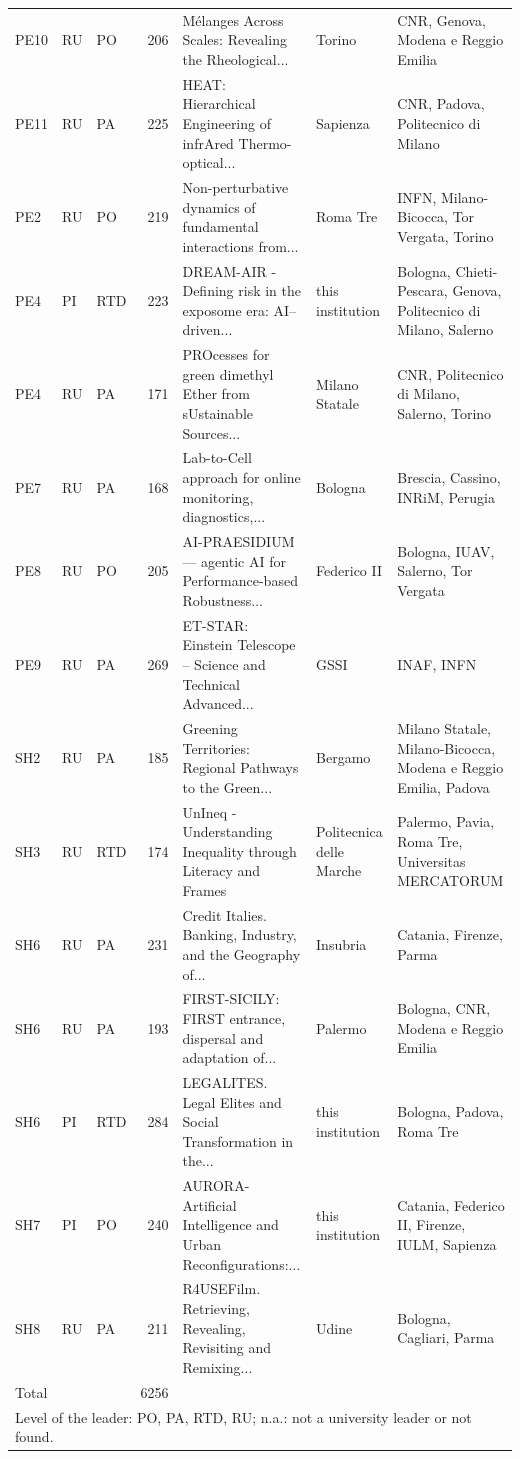 \documentclass[11pt,a4paper]{article}
\begin{document}
{\begin{longtable}{lllrp{4.2cm}p{2cm}p{3.2cm}}
PE10 & RU & PO & 206 & Mélanges Across Scales: Revealing the Rheological... & Torino & CNR, Genova, Modena e Reggio Emilia \\
PE11 & RU & PA & 225 & HEAT: Hierarchical Engineering of infrAred Thermo-optical... & Sapienza & CNR, Padova, Politecnico di Milano \\
PE2 & RU & PO & 219 & Non-perturbative dynamics of fundamental interactions from... & Roma Tre & INFN, Milano-Bicocca, Tor Vergata, Torino \\
PE4 & PI & RTD & 223 & DREAM-AIR - Defining risk in the exposome era: AI–driven... & this institution & Bologna, Chieti-Pescara, Genova, Politecnico di Milano, Salerno \\
PE4 & RU & PA & 171 & PROcesses for green dimethyl Ether from sUstainable Sources... & Milano Statale & CNR, Politecnico di Milano, Salerno, Torino \\
PE7 & RU & PA & 168 & Lab-to-Cell approach for online monitoring, diagnostics,... & Bologna & Brescia, Cassino, INRiM, Perugia \\
PE8 & RU & PO & 205 & AI-PRAESIDIUM — agentic AI for Performance-based Robustness... & Federico II & Bologna, IUAV, Salerno, Tor Vergata \\
PE9 & RU & PA & 269 & ET-STAR: Einstein Telescope – Science and Technical Advanced... & GSSI & INAF, INFN \\
SH2 & RU & PA & 185 & Greening Territories: Regional Pathways to the Green... & Bergamo & Milano Statale, Milano-Bicocca, Modena e Reggio Emilia, Padova \\
SH3 & RU & RTD & 174 & UnIneq - Understanding Inequality through Literacy and Frames & Politecnica delle Marche & Palermo, Pavia, Roma Tre, Universitas MERCATORUM \\
SH6 & RU & PA & 231 & Credit Italies. Banking, Industry, and the Geography of... & Insubria & Catania, Firenze, Parma \\
SH6 & RU & PA & 193 & FIRST-SICILY: FIRST entrance, dispersal and adaptation of... & Palermo & Bologna, CNR, Modena e Reggio Emilia \\
SH6 & PI & RTD & 284 & LEGALITES. Legal Elites and Social Transformation in the... & this institution & Bologna, Padova, Roma Tre \\
SH7 & PI & PO & 240 & AURORA- Artificial Intelligence and Urban Reconfigurations:... & this institution & Catania, Federico II, Firenze, IULM, Sapienza \\
SH8 & RU & PA & 211 & R4USEFilm. Retrieving, Revealing, Revisiting and Remixing... & Udine & Bologna, Cagliari, Parma \\
\midrule
Total &  &  & 6256 &  &  &  \\
\bottomrule
\multicolumn{7}{l}{\footnotesize Level of the leader: PO, PA, RTD, RU; n.a.: not a university leader or not found.} \\
\end{longtable}
}
\end{document}
